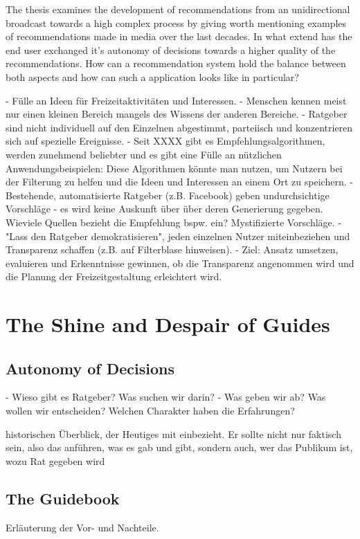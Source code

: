 \documentclass[12pt,numbers=noenddot,parskip,bibliography=totocnumbered,listof=totocnumbered]{scrreprt}
\begin{document}
The thesis examines the development of recommendations from an unidirectional broadcast towards a high complex process by giving worth mentioning examples of recommendations made in media over the last decades. In what extend has the end user exchanged it's autonomy of decisions towards a higher quality of the recommendations. How can a recommendation system hold the balance between both aspects and how can such a application looks like in particular?

- Fülle an Ideen für Freizeitaktivitäten und Interessen.
- Menschen kennen meist nur einen kleinen Bereich mangels des Wissens der anderen Bereiche.
- Ratgeber sind nicht individuell auf den Einzelnen abgestimmt, parteiisch und konzentrieren sich auf spezielle Ereignisse.
- Seit XXXX gibt es Empfehlungsalgorithmen, werden zunehmend beliebter und es gibt eine Fülle an nützlichen Anwendungsbeispielen: Diese Algorithmen könnte man nutzen, um Nutzern bei der Filterung zu helfen und die Ideen und Interessen an einem Ort zu speichern.
- Bestehende, automatisierte Ratgeber (z.B. Facebook) geben undurchsichtige Vorschläge - es wird keine Auskunft über über deren Generierung gegeben. 
Wieviele Quellen bezieht die Empfehlung bspw. ein? Mystifizierte Vorschläge.
- "Lass den Ratgeber demokratisieren", jeden einzelnen Nutzer miteinbeziehen und Transparenz schaffen (z.B. auf Filterblase hinweisen).
- Ziel: Ansatz umsetzen, evaluieren und Erkenntnisse gewinnen, ob die Transparenz angenommen wird und die Planung der Freizeitgestaltung erleichtert wird.

\chapter{The Shine and Despair of Guides}

\section{Autonomy of Decisions}
- Wieso gibt es Ratgeber? Was suchen wir darin?
- Was geben wir ab? Was wollen wir entscheiden? Welchen Charakter haben die Erfahrungen?

historischen Überblick, der Heutiges mit einbezieht. Er sollte nicht nur faktisch sein, also das anführen, was es gab und gibt, sondern auch, wer das Publikum ist, wozu Rat gegeben wird
\section{The Guidebook}
Erläuterung der Vor- und Nachteile.
\end{document}
